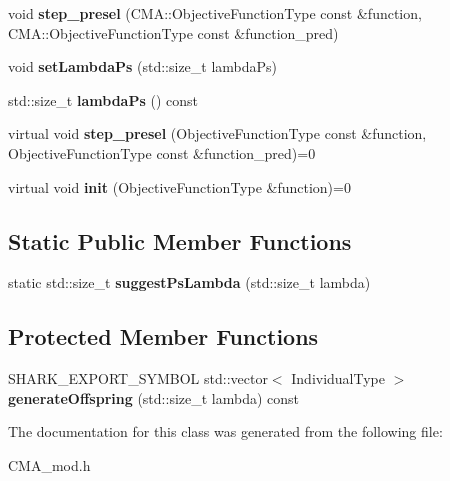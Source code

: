 \begin{DoxyCompactItemize}
\item 
void {\bfseries step\+\_\+presel} (C\+M\+A\+::\+Objective\+Function\+Type const \&function, C\+M\+A\+::\+Objective\+Function\+Type const \&function\+\_\+pred)\hypertarget{classCMA__mod_a24e3aad56ca13d46a1b95c1843cc5ec5}{}\label{classCMA__mod_a24e3aad56ca13d46a1b95c1843cc5ec5}

\item 
void {\bfseries set\+Lambda\+Ps} (std\+::size\+\_\+t lambda\+Ps)\hypertarget{classCMA__mod_a7986d1467e8232683d1dada6e7b285ec}{}\label{classCMA__mod_a7986d1467e8232683d1dada6e7b285ec}

\item 
std\+::size\+\_\+t {\bfseries lambda\+Ps} () const \hypertarget{classCMA__mod_a6a20d40dad3af506abd042ff1f16bc34}{}\label{classCMA__mod_a6a20d40dad3af506abd042ff1f16bc34}

\item 
virtual void {\bfseries step\+\_\+presel} (Objective\+Function\+Type const \&function, Objective\+Function\+Type const \&function\+\_\+pred)=0\hypertarget{classAbstractPreselecter_ac7bd0dac8d7eaf85319524ee6d80f52d}{}\label{classAbstractPreselecter_ac7bd0dac8d7eaf85319524ee6d80f52d}

\item 
virtual void {\bfseries init} (Objective\+Function\+Type \&function)=0\hypertarget{classAbstractPreselecter_ac9283e597dc5d633b1f7ce959881dbb8}{}\label{classAbstractPreselecter_ac9283e597dc5d633b1f7ce959881dbb8}

\end{DoxyCompactItemize}
\subsection*{Static Public Member Functions}
\begin{DoxyCompactItemize}
\item 
static std\+::size\+\_\+t {\bfseries suggest\+Ps\+Lambda} (std\+::size\+\_\+t lambda)\hypertarget{classCMA__mod_a98b8aab7fa69327207d124b5525deddf}{}\label{classCMA__mod_a98b8aab7fa69327207d124b5525deddf}

\end{DoxyCompactItemize}
\subsection*{Protected Member Functions}
\begin{DoxyCompactItemize}
\item 
S\+H\+A\+R\+K\+\_\+\+E\+X\+P\+O\+R\+T\+\_\+\+S\+Y\+M\+B\+OL std\+::vector$<$ Individual\+Type $>$ {\bfseries generate\+Offspring} (std\+::size\+\_\+t lambda) const \hypertarget{classCMA__mod_a8db4d68c7665ef05903a900097109a38}{}\label{classCMA__mod_a8db4d68c7665ef05903a900097109a38}

\end{DoxyCompactItemize}


The documentation for this class was generated from the following file\+:\begin{DoxyCompactItemize}
\item 
C\+M\+A\+\_\+mod.\+h\end{DoxyCompactItemize}
